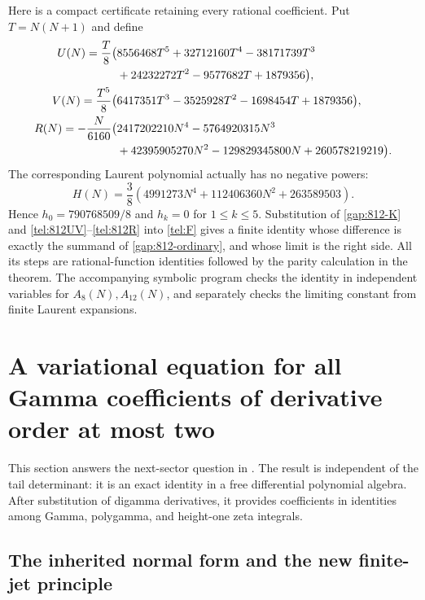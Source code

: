 \documentclass[11pt,letterpaper]{article}
\numberwithin{equation}{section}
\theoremstyle{plain}
\theoremstyle{definition}
\theoremstyle{remark}
\begin{document}
Here is a compact certificate retaining every rational coefficient.
Put $T=N(N+1)$ and define
\begin{align}\label{tel:812UV}
 U(N)=\frac{T}{8}\bigl(&8556468T^5+32712160T^4-38171739T^3\notag\\
      &+24232272T^2-9577682T+1879356\bigr),\\
 V(N)=\frac{T^5}{8}\bigl(&6417351T^3-3525928T^2-1698454T+1879356\bigr),\notag\\
 R(N)=-\frac{N}{6160}\bigl(&2417202210N^4-5764920315N^3\notag\\
      &+42395905270N^2-129829345800N+260578219219\bigr).
      \label{tel:812R}
\end{align}
The corresponding Laurent polynomial actually has no negative powers:
\[
 H(N)=\frac38\left(4991273N^4+112406360N^2+263589503\right).
\]
Hence $h_0=790768509/8$ and $h_k=0$ for $1\le k\le5$.
Substitution of \eqref{gap:812-K} and \eqref{tel:812UV}--\eqref{tel:812R} into
\eqref{tel:F} gives a finite identity whose difference is exactly
the summand of \eqref{gap:812-ordinary}, and whose limit is the right
side. All its steps are rational-function identities followed by the
parity calculation in the theorem. The accompanying symbolic program
checks the identity in independent variables for $A_8(N),A_{12}(N)$,
and separately checks the limiting constant from finite Laurent
expansions.


\section{A variational equation for all Gamma coefficients of derivative order at most two}
\label{var:section}

This section answers the next-sector question in
\cite[research questions 4--5]{PTI}. The result is independent of the
tail determinant: it is an exact identity in a free differential
polynomial algebra. After substitution of digamma derivatives, it
provides coefficients in identities among Gamma, polygamma, and
height-one zeta integrals.

\subsection{The inherited normal form and the new finite-jet principle}
\end{document}
